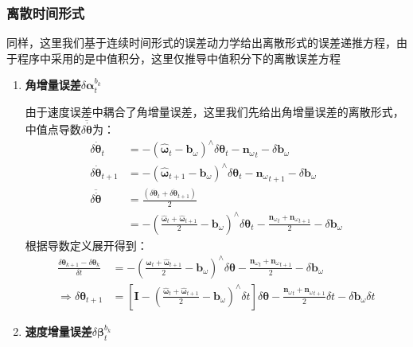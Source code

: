 \subsubsection{离散时间形式}
同样，这里我们基于连续时间形式的误差动力学给出离散形式的误差递推方程，由于程序中采用的是中值积分，这里仅推导中值积分下的离散误差方程
\begin{enumerate}
	\item \textbf{角增量误差}$\delta\bm{\alpha}_t^{b_k}$
	
	由于速度误差中耦合了角增量误差，这里我们先给出角增量误差的离散形式，中值点导数$\overline{\delta\dot{\bm{\theta}}}$为：
	\begin{equation}
	\begin{aligned}
	\delta\dot{\bm{\theta}}_t&=-\left(\hat{\bm{\omega}}_t-\bm{b}_\omega\right)^\wedge\delta\bm{\theta}_t-{\bm{n}_\omega}_t-\delta\bm{b}_\omega\\
	\delta\dot{\bm{\theta}}_{t+1}&=-\left(\hat{\bm{\omega}}_{t+1}-\bm{b}_\omega\right)^\wedge\delta\bm{\theta}_t-{\bm{n}_\omega}_{t+1}-\delta\bm{b}_\omega\\
	\overline{\delta\dot{\bm{\theta}}}&=\frac{\left(\delta\dot{\bm{\theta}}_t+\delta\dot{\bm{\theta}}_{t+1}\right)}{2}\\
	&=-\left(\frac{\hat{\bm{\omega}}_t+\hat{\bm{\omega}}_{t+1}}{2}-\bm{b}_\omega\right)^\wedge\delta\bm{\theta}_t-\frac{{\bm{n}_\omega}_t+{\bm{n}_\omega}_{t+1}}{2}-\delta\bm{b}_\omega
	\end{aligned}
	\end{equation}
	根据导数定义展开得到：
	\begin{equation}
	\begin{aligned}
	\frac{\delta\bm{\theta}_{k+1}-\delta\bm{\theta}_k}{\delta t}&=-\left(\frac{\hat{\bm{\omega}}_t+\hat{\bm{\omega}}_{t+1}}{2}-\bm{b}_\omega\right)^\wedge\delta\bm{\theta}-\frac{{\bm{n}_\omega}_t+{\bm{n}_\omega}_{t+1}}{2}-\delta\bm{b}_\omega\\
	\Rightarrow\delta\bm{\theta}_{t+1}&=\left[\bm{I}-\left(\frac{\hat{\bm{\omega}}_t+\hat{\bm{\omega}}_{t+1}}{2}-\bm{b}_\omega\right)^\wedge\delta t\right]\delta\bm{\theta}-\frac{{\bm{n}_\omega}_t+{\bm{n}_\omega}_{t+1}}{2}\delta t-\delta\bm{b}_\omega\delta t
	\end{aligned}
	\label{eq.delta_theta_discrete}
	\end{equation}
	
	\item \textbf{速度增量误差}$\delta\bm{\beta}_t^{b_k}$
	

\end{enumerate}

